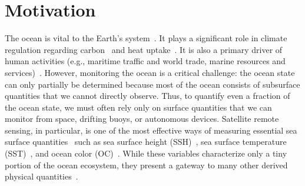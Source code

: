 \section{Motivation}

The ocean is vital to the Earth's system~\cite{OCEANWARMING}. 
It plays a significant role in climate regulation regarding carbon~\cite{OCEANCARBONCYCLE} and heat uptake~\cite{OCEANHEATUPTAKE}. It is also a primary driver of human activities (e.g., maritime traffic and world trade, marine resources and services)~\cite{SSHOPERATIONAL, ML4OCN}. 
However, monitoring the ocean is a critical challenge: the ocean state can only partially be determined because most of the ocean consists of subsurface quantities that we cannot directly observe. 
Thus, to quantify even a fraction of the ocean state, we must often rely only on surface quantities that we can monitor from space, drifting buoys, or autonomous devices.
Satellite remote sensing, in particular, is one of the most effective ways of measuring essential sea surface quantities~\cite{Altimetry} such as sea surface height (SSH)~\cite{DUACS}, sea surface temperature (SST)~\cite{OCEANSATELLITESST}, and ocean color (OC)~\cite{OCEANSATELLITEOC}. 
While these variables characterize only a tiny portion of the ocean ecosystem, they present a gateway to many other derived physical quantities~\cite{ML4OCN}.


